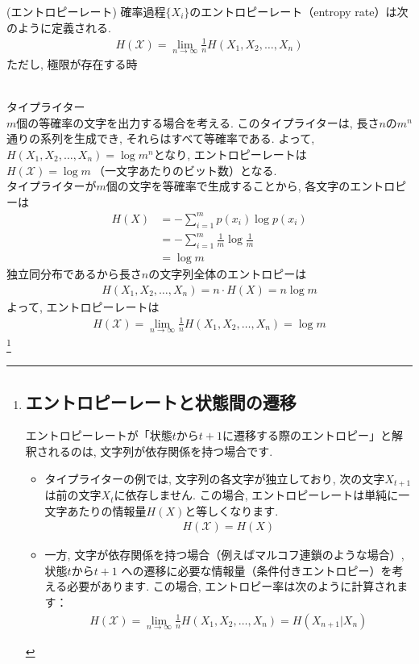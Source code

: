 \documentclass[a4j]{jsarticle}
\begin{document}
\begin{itembox}[l]{ (エントロピーレート)}
	確率過程$\{X_i\}$のエントロピーレート（entropy rate）は次のように定義される.
	\begin{align}
		H(\mathcal{X}) = \lim_{n \rightarrow \infty} \frac{1}{n}H(X_1, X_2, \ldots, X_n)
	\end{align}
	ただし, 極限が存在する時
\end{itembox}\\

 タイプライター\\

$m$個の等確率の文字を出力する場合を考える. このタイプライターは, 長さ$n$の$m^n$通りの系列を生成でき, それらはすべて等確率である. よって, $H(X_1, X_2, \ldots, X_n) = \log m^n$となり, エントロピーレートは$H(\mathcal{X}) = \log m \: \mbox{（一文字あたりのビット数）}$となる.\\

 タイプライターが$m$個の文字を等確率で生成することから, 各文字のエントロピーは
\begin{align}
	H(X) & = - \sum_{i=1}^{m} p(x_i)\log p(x_i)            \\
	     & = - \sum_{i=1}^{m} \frac{1}{m} \log \frac{1}{m} \\
	     & = \log m
\end{align}
独立同分布であるから長さ$n$の文字列全体のエントロピーは
\begin{align}
	H(X_1, X_2, \ldots, X_n) = n \cdot H(X) = n \log m
\end{align}
よって, エントロピーレートは
\begin{align}
	H(\mathcal{X}) = \lim_{n \rightarrow \infty} \frac{1}{n} H(X_1, X_2, \ldots, X_n) = \log m
\end{align}
\footnote{
	\subsection*{エントロピーレートと状態間の遷移}

	エントロピーレートが「状態$t$から$t+1$に遷移する際のエントロピー」と解釈されるのは, 文字列が依存関係を持つ場合です.
	\begin{itemize}
		\item タイプライターの例では, 文字列の各文字が独立しており, 次の文字$X_{t+1}$は前の文字$X_t$に依存しません. この場合, エントロピーレートは単純に一文字あたりの情報量$H(X)$と等しくなります.
		      \begin{align*}
			      H(\mathcal{X}) = H(X)
		      \end{align*}
		\item 一方, 文字が依存関係を持つ場合（例えばマルコフ連鎖のような場合）, 状態$t$から$t+1$ への遷移に必要な情報量（条件付きエントロピー）を考える必要があります. この場合, エントロピー率は次のように計算されます：
		      \begin{align*}
			      H(\mathcal{X})= \lim_{n \rightarrow \infty} \frac{1}{n} H(X_1, X_2, \ldots, X_n) = H(X_{n+1} | X_n)
		      \end{align*}
	\end{itemize}
}
\end{document}
